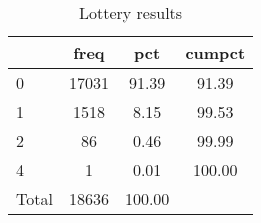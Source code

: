 \begin{table}[htbp]\centering
\def\sym#1{\ifmmode^{#1}\else\(^{#1}\)\fi}
\caption{Lottery results}
\begin{tabular}{l*{1}{ccc}}
\toprule
                    &        freq&         pct&      cumpct\\
\midrule
0                   &       17031&       91.39&       91.39\\
1                   &        1518&        8.15&       99.53\\
2                   &          86&        0.46&       99.99\\
4                   &           1&        0.01&      100.00\\
Total               &       18636&      100.00&            \\
\bottomrule
\end{tabular}
\end{table}
